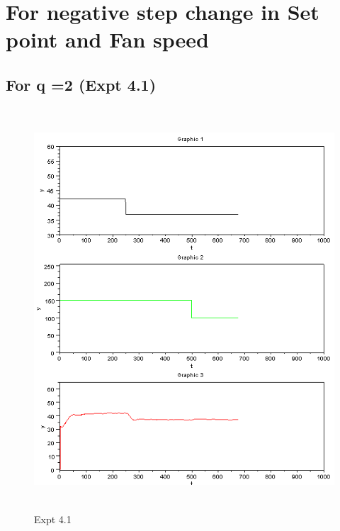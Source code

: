\section{For negative step change in Set point and Fan speed }
\subsection{For q =2 (Expt 4.1) }
\begin{figure}[H]
  \includegraphics[width=12cm, height=15cm]{mpc/4_1.PNG}
  \caption{Expt 4.1}
\end{figure}
